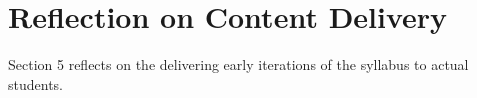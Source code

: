 \section{Reflection on Content Delivery}

Section 5 reflects on the delivering early iterations of the syllabus to actual students.

